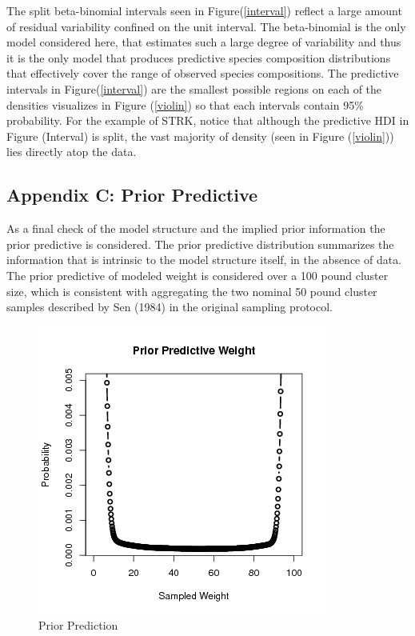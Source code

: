 \documentclass[12pt]{article}
\begin{document}
The split beta-binomial intervals seen in Figure(\ref{interval}) reflect
a large amount of residual variability confined on the unit interval.
The beta-binomial is the only model considered here, that estimates such
a large degree of variability and thus it is the only model that
produces predictive species composition distributions that effectively
cover the range of observed species compositions. The predictive
intervals in Figure(\ref{interval}) are the smallest possible regions on
each of the densities visualizes in Figure (\ref{violin}) so that each
intervals contain 95\% probability. For the example of STRK, notice that
although the predictive HDI in Figure (Interval) is split, the vast
majority of density (seen in Figure (\ref{violin})) lies directly atop the
data.

\subsection{Appendix C: Prior
Predictive}\label{appendix-c-prior-predictive}

As a final check of the model structure and the implied prior
information the prior predictive is considered. The prior predictive
distribution summarizes the information that is intrinsic to the model
structure itself, in the absence of data. The prior predictive of
modeled weight is considered over a 100 pound cluster size, which is
consistent with aggregating the two nominal 50 pound cluster samples
described by Sen (1984) in the original sampling protocol.

\begin{figure}[htbp]
\centering
\includegraphics{./pictures/priorPredict.png}
\caption{Prior Prediction}
\label{priorPrediction}
\end{figure}
\end{document}
